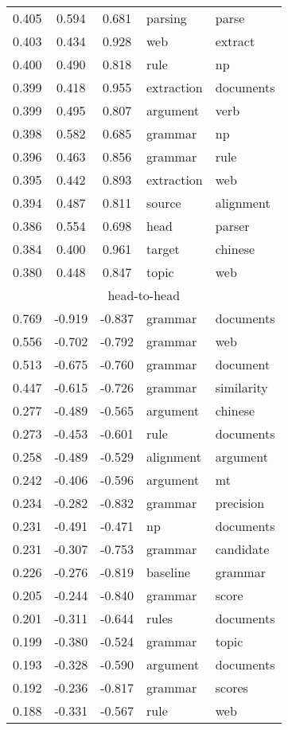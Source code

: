 \begin{tabular}{cccp{5cm}p{5cm}}
0.405 & 0.594 & 0.681 & parsing & parse \\
0.403 & 0.434 & 0.928 & web & extract \\
0.400 & 0.490 & 0.818 & rule & np \\
0.399 & 0.418 & 0.955 & extraction & documents \\
0.399 & 0.495 & 0.807 & argument & verb \\
0.398 & 0.582 & 0.685 & grammar & np \\
0.396 & 0.463 & 0.856 & grammar & rule \\
0.395 & 0.442 & 0.893 & extraction & web \\
0.394 & 0.487 & 0.811 & source & alignment \\
0.386 & 0.554 & 0.698 & head & parser \\
0.384 & 0.400 & 0.961 & target & chinese \\
0.380 & 0.448 & 0.847 & topic & web \\
\midrule
\multicolumn{5}{c}{head-to-head}\\
0.769 & -0.919 & -0.837 & grammar & documents \\
0.556 & -0.702 & -0.792 & grammar & web \\
0.513 & -0.675 & -0.760 & grammar & document \\
0.447 & -0.615 & -0.726 & grammar & similarity \\
0.277 & -0.489 & -0.565 & argument & chinese \\
0.273 & -0.453 & -0.601 & rule & documents \\
0.258 & -0.489 & -0.529 & alignment & argument \\
0.242 & -0.406 & -0.596 & argument & mt \\
0.234 & -0.282 & -0.832 & grammar & precision \\
0.231 & -0.491 & -0.471 & np & documents \\
0.231 & -0.307 & -0.753 & grammar & candidate \\
0.226 & -0.276 & -0.819 & baseline & grammar \\
0.205 & -0.244 & -0.840 & grammar & score \\
0.201 & -0.311 & -0.644 & rules & documents \\
0.199 & -0.380 & -0.524 & grammar & topic \\
0.193 & -0.328 & -0.590 & argument & documents \\
0.192 & -0.236 & -0.817 & grammar & scores \\
0.188 & -0.331 & -0.567 & rule & web \\

\end{tabular}
